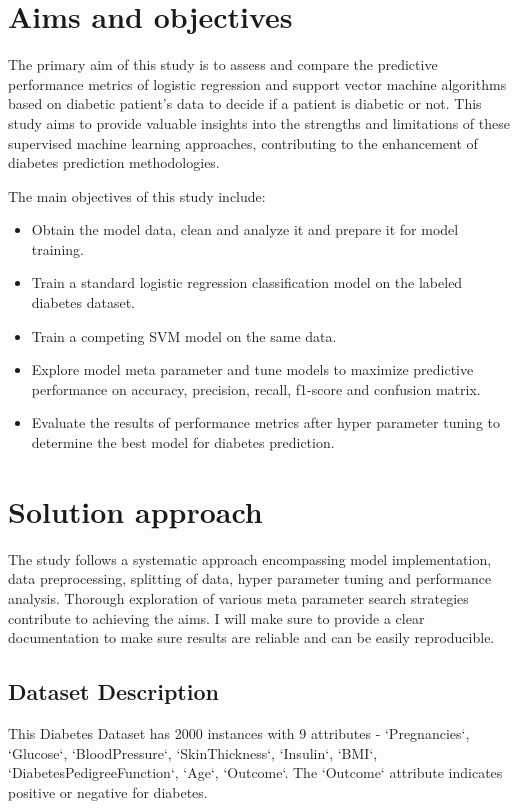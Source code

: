 \section{Aims and objectives}
\label{sec:intro_aims_obj}

The primary aim of this study is to assess and compare the predictive performance metrics of logistic regression and support vector machine algorithms based on diabetic patient's data to decide if a patient is diabetic or not. This study aims to provide valuable insights into the strengths and limitations of these supervised machine learning approaches, contributing to the enhancement of diabetes prediction methodologies.

The main objectives of this study include:
\begin{itemize}
    \item Obtain the model data, clean and analyze it and prepare it for model training.
    \item  Train a standard logistic regression classification model on the labeled diabetes dataset.
    \item Train a competing SVM model on the same data.
    \item Explore model meta parameter and tune models to maximize predictive performance on accuracy, precision, recall, f1-score and confusion matrix.
    \item Evaluate the results of performance metrics after hyper parameter tuning to determine the best model for diabetes prediction. 
\end{itemize}


\section{Solution approach}
\label{sec:intro_sol} %
The study follows a systematic approach encompassing model implementation, data preprocessing, splitting of data, hyper parameter tuning and performance analysis. Thorough exploration of various meta parameter search strategies contribute to achieving the aims. I will make sure to provide a clear documentation to make sure results are reliable and can be easily reproducible.

\subsection{Dataset Description}
\label{sec:intro_some_sub1}
This Diabetes Dataset \cite{dataset} has 2000 instances with 9 attributes - `Pregnancies`, `Glucose`, `BloodPressure`, `SkinThickness`, `Insulin`, `BMI`, `DiabetesPedigreeFunction`, `Age`, `Outcome`. The `Outcome` attribute indicates positive or negative for diabetes. 

